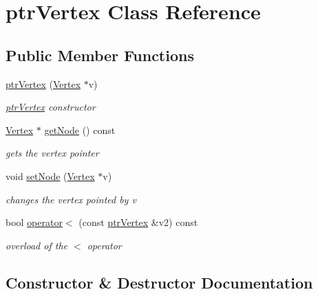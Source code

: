 \hypertarget{classptr_vertex}{}\section{ptr\+Vertex Class Reference}
\label{classptr_vertex}
\subsection*{Public Member Functions}
\begin{DoxyCompactItemize}
\item 
\hyperlink{classptr_vertex_a37ea9f420340f23535506cdd94c171fb}{ptr\+Vertex} (\hyperlink{class_vertex}{Vertex} $\ast$v)
\begin{DoxyCompactList}\small\item\em \hyperlink{classptr_vertex}{ptr\+Vertex} constructor \end{DoxyCompactList}\item 
\hyperlink{class_vertex}{Vertex} $\ast$ \hyperlink{classptr_vertex_ad1a3f483698686375915958c5f1bd392}{get\+Node} () const
\begin{DoxyCompactList}\small\item\em gets the vertex pointer \end{DoxyCompactList}\item 
void \hyperlink{classptr_vertex_aeb0df2a84ad85a3160a8826bdb0262c1}{set\+Node} (\hyperlink{class_vertex}{Vertex} $\ast$v)
\begin{DoxyCompactList}\small\item\em changes the vertex pointed by v \end{DoxyCompactList}\item 
bool \hyperlink{classptr_vertex_a01e43c00074e9453d97db44f4e8a75b4}{operator$<$} (const \hyperlink{classptr_vertex}{ptr\+Vertex} \&v2) const
\begin{DoxyCompactList}\small\item\em overload of the $<$ operator \end{DoxyCompactList}\end{DoxyCompactItemize}


\subsection{Constructor \& Destructor Documentation}
\hypertarget{classptr_vertex_a37ea9f420340f23535506cdd94c171fb}{}\label{classptr_vertex_a37ea9f420340f23535506cdd94c171fb} 
